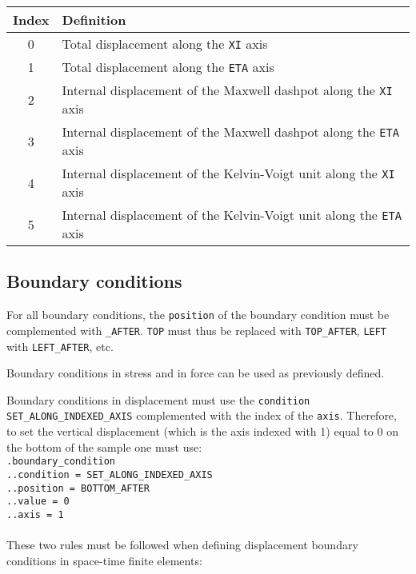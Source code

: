 \documentclass[10pt]{article}
\begin{document}
\begin{table}[h!]
\begin{center}
\begin{tabular}{cl}
\hline
Index & Definition \\
\hline
0 & Total displacement along the \verb+XI+ axis \\
1 & Total displacement along the \verb+ETA+ axis \\
2 & Internal displacement of the Maxwell dashpot along the \verb+XI+ axis \\
3 & Internal displacement of the Maxwell dashpot along the \verb+ETA+ axis \\
4 & Internal displacement of the Kelvin-Voigt unit along the \verb+XI+ axis \\
5 & Internal displacement of the Kelvin-Voigt unit along the \verb+ETA+ axis \\
\hline
\end{tabular}
\end{center}
\end{table}

\subsection{Boundary conditions}

For all boundary conditions, the \verb+position+ of the boundary condition must be complemented with \verb+_AFTER+. \verb+TOP+ must thus be replaced with \verb+TOP_AFTER+, \verb+LEFT+ with \verb+LEFT_AFTER+, etc.

Boundary conditions in stress and in force can be used as previously defined.

Boundary conditions in displacement must use the \verb+condition+ \verb+SET_ALONG_INDEXED_AXIS+ complemented with the index of the \verb+axis+. Therefore, to set the vertical displacement (which is the axis indexed with 1) equal to 0 on the bottom of the sample one must use:\\

\noindent \verb+.boundary_condition+\\
\verb+..condition = SET_ALONG_INDEXED_AXIS+\\
\verb+..position = BOTTOM_AFTER+\\
\verb+..value = 0+\\
\verb+..axis = 1+

\paragraph{} These two rules must be followed when defining displacement boundary conditions in space-time finite elements:
\end{document}

